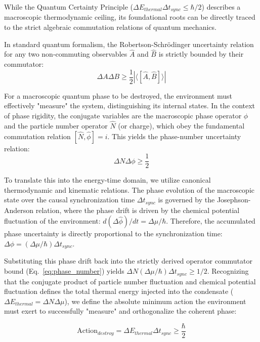 \documentclass[11pt,a4paper]{article}
\begin{document}
While the Quantum Certainty Principle ($\Delta E_{thermal} \Delta t_{sync} \le \hbar/2$) describes a macroscopic thermodynamic ceiling, its foundational roots can be directly traced to the strict algebraic commutation relations of quantum mechanics.

In standard quantum formalism, the Robertson-Schr\"{o}dinger uncertainty relation for any two non-commuting observables $\hat{A}$ and $\hat{B}$ is strictly bounded by their commutator:
\begin{equation}
\label{eq:robertson_schrodinger}
    \Delta A \Delta B \ge \frac{1}{2} |\langle [\hat{A}, \hat{B}] \rangle|
\end{equation}

For a macroscopic quantum phase to be destroyed, the environment must effectively "measure" the system, distinguishing its internal states. In the context of phase rigidity, the conjugate variables are the macroscopic phase operator $\hat{\phi}$ and the particle number operator $\hat{N}$ (or charge), which obey the fundamental commutation relation $[\hat{N}, \hat{\phi}] = i$. This yields the phase-number uncertainty relation:
\begin{equation}
\label{eq:phase_number}
    \Delta N \Delta \phi \ge \frac{1}{2}
\end{equation}

To translate this into the energy-time domain, we utilize canonical thermodynamic and kinematic relations. The phase evolution of the macroscopic state over the causal synchronization time $\Delta t_{sync}$ is governed by the Josephson-Anderson relation, where the phase drift is driven by the chemical potential fluctuation of the environment: $d(\Delta\hat{\phi})/dt = \Delta\mu / \hbar$. Therefore, the accumulated phase uncertainty is directly proportional to the synchronization time: $\Delta \phi = (\Delta \mu / \hbar) \Delta t_{sync}$.

Substituting this phase drift back into the strictly derived operator commutator bound (Eq.~\ref{eq:phase_number}) yields $\Delta N (\Delta \mu / \hbar) \Delta t_{sync} \ge 1/2$. Recognizing that the conjugate product of particle number fluctuation and chemical potential fluctuation defines the total thermal energy injected into the condensate ($\Delta E_{thermal} = \Delta N \Delta \mu$), we define the absolute minimum action the environment must exert to successfully "measure" and orthogonalize the coherent phase:

\begin{equation}
\label{eq:action_destroy}
\text{Action}_{destroy} = \Delta E_{thermal} \Delta t_{sync} \ge \frac{\hbar}{2}
\end{equation}
\end{document}
